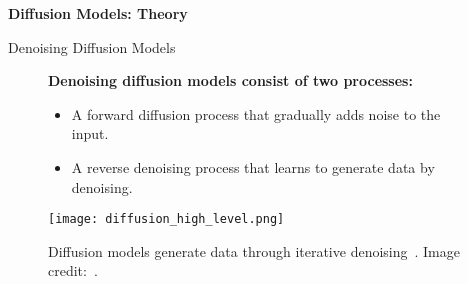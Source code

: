 
\begin{refsection}
  \begin{frame}
    \centering
    \vspace{2.5cm}
    {\LARGE \textbf{Diffusion Models: Theory}}
  \end{frame}
\end{refsection}

\begin{refsection}
  \begin{frame}{Denoising Diffusion Models}
  
    \begin{figure}
      \begin{minipage}{0.95\linewidth}
        \footnotesize
        \textbf{Denoising diffusion models consist of two processes:}
        \begin{itemize}
          \item A forward diffusion process that gradually adds noise to the input.
          \item A reverse denoising process that learns to generate data by denoising.
        \end{itemize}
      \end{minipage}
      \vspace{2em}
  
      \centering
      \texttt{[image: diffusion\_high\_level.png]}
  
      \caption[]{\scriptsize Diffusion models generate data through iterative denoising~\parencite{sohl2015deep,ho2020denoising}. \scriptsize Image credit:~\cite{CVPR2023Tutorial}.}
    \end{figure}
    \bottomleftrefs
  \end{frame}
\end{refsection}

